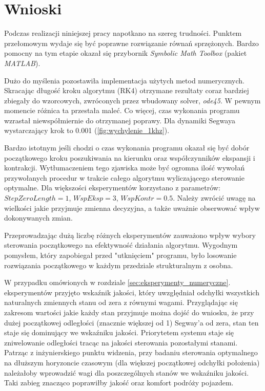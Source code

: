 \section{Wnioski}
\label{sec:wnioski}

Podczas realizacji niniejszej pracy napotkano na szereg trudności. Punktem przełomowym wydaje się być poprawne rozwiązanie równań sprzężonych. Bardzo pomocny na tym etapie okazał się przybornik \textit{Symbolic Math Toolbox} (pakiet \textit{MATLAB}).

Dużo do myślenia pozostawiła implementacja użytych metod numerycznych. Skracając długość kroku algorytmu (RK4) otrzymane rezultaty coraz bardziej zbiegały do wzorcowych, zwróconych przez wbudowany solver, \textit{ode45}. W pewnym momencie różnica ta przestała maleć. Co więcej, czas wykonania programu wzrastał niewspółmiernie do otrzymanej poprawy. Dla dynamiki Segwaya wystarczający krok to 0.001 (\ref{fig:wychylenie_1khz}).

Bardzo istotnym jeśli chodzi o czas wykonania programu okazał się być dobór początkowego kroku poszukiwania na kierunku oraz współczynników  ekspansji i kontrakcji. Wytłumaczeniem tego zjawiska może być ogromna ilość wywołań przywołanych procedur w trakcie całego algorytmu wyliczającego sterowanie optymalne. Dla większości eksperymentów korzystano z parametrów: $StepZeroLength = 1$, $WspEksp = 3$, $WspKontr = 0.5$. Należy zwrócić uwagę na wielkości jakie przyjmuje zmienna decyzyjna, a także uważnie obserwować wpływ dokonywanych zmian.

Przeprowadzając dużą liczbę różnych eksperymentów zauważono wpływ wybory sterowania początkowego na efektywność działania algorytmu. Wygodnym pomysłem, który zapobiegał przed "utknięciem" programu, było losowanie rozwiązania początkowego w każdym przedziale strukturalnym z osobna.

W przypadku omówionych w rozdziale \ref{sec:eksperymenty_numeryczne}. eksperymentów przyjęto wskaźnik jakości, który uwzględniał odchyłki wszystkich naturalnych zmiennych stanu od zera z równymi wagami. Przyglądając się zakresom wartości jakie każdy stan przyjmuje można dojść do wniosku, że przy dużej początkowej odległości (znacznie większej od 1) Segway'a od zera, stan ten staje się dominujący we wskaźniku jakości. Priorytetem systemu staje się zniwelowanie odległości tracąc na jakości sterowania pozostałymi stanami. Patrząc z inżynierskiego punktu widzenia, przy badaniu sterowania optymalnego na dłuższym horyzoncie czasowym (dla większej początkowej odchyłki położenia) należałoby wprowadzić wagi dla poszczególnych stanów we wskaźniku jakości. Taki zabieg znacząco poprawiłby jakość oraz komfort podróży pojazdem.
